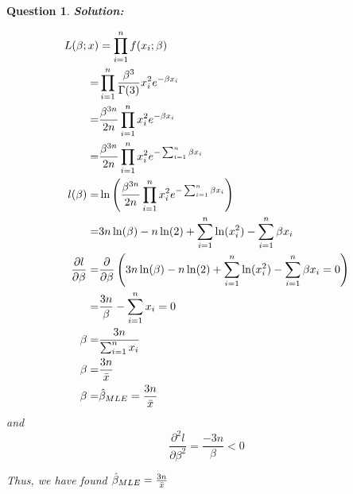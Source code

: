 \documentclass{article}
\theoremstyle{questionstyle}
\newtheorem{myquestion}{Question}
\begin{document}
\begin{myquestion}
\textbf{Solution:}

\begin{align*}
    L(\beta;x) &= \prod_{i=1}^n f(x_i;\beta)\\
    =& \prod_{i=1}^n \frac{\beta^{3}}{\Gamma(3)} x_i^{2}e^{-\beta x_i}\\
    =& \frac{\beta^{3n}}{2n} \prod_{i=1}^n x_i^{2}e^{-\beta x_i}\\
    =& \frac{\beta^{3n}}{2n} \prod_{i=1}^n x_i^{2}e^{-\sum_{i=1}^n\beta x_i}\\
    l(\beta) =& \ln \left( \frac{\beta^{3n}}{2n} \prod_{i=1}^n x_i^{2}e^{-\sum_{i=1}^n\beta x_i} \right)\\
    =& 3n\ln(\beta) - n\ln(2) + \sum_{i=1}^n \ln(x_i^2) - \sum_{i=1}^n\beta x_i\\
    \frac{\partial l}{\partial \beta}=& \frac{\partial}{\partial \beta} \left( 3n\ln(\beta) - n\ln(2) + \sum_{i=1}^n \ln(x_i^2) - \sum_{i=1}^n\beta x_i = 0\right)\\
    =& \frac{3n}{\beta} - \sum_{i=1}^n x_i = 0\\
    \beta =& \frac{3n}{\sum_{i=1}^n x_i}\\
    \beta =& \frac{3n}{\Bar{x}}\\
    \beta =& \hat{\beta}_{MLE} = \frac{3n}{\Bar{x}}
\end{align*}
and 
\[  \frac{\partial^2 l}{\partial \beta^2 } = \frac{-3n}{\beta} < 0 \]

Thus, we have found \(\hat{\beta}_{MLE} = \frac{3n}{\Bar{x}}\)

\end{myquestion}%
\end{document}
